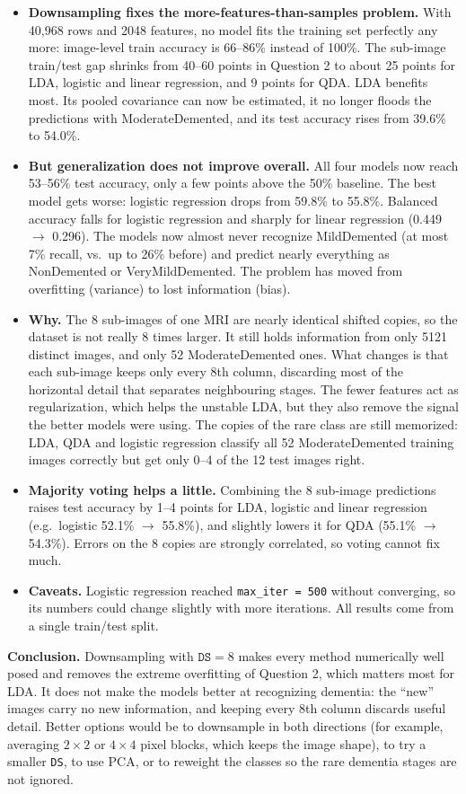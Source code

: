 \documentclass[11pt]{article}
\begin{document}
\begin{itemize}
  \item \textbf{Downsampling fixes the more-features-than-samples problem.} With 40{,}968 rows
  and 2048 features, no model fits the training set perfectly any more: image-level train
  accuracy is 66--86\% instead of 100\%. The sub-image train/test gap shrinks from 40--60
  points in Question 2 to about 25 points for LDA, logistic and linear regression, and 9
  points for QDA. LDA benefits most. Its pooled covariance can now be estimated, it no longer
  floods the predictions with ModerateDemented, and its test accuracy rises from 39.6\% to
  54.0\%.
  \item \textbf{But generalization does not improve overall.} All four models now reach
  53--56\% test accuracy, only a few points above the 50\% baseline. The best model gets
  worse: logistic regression drops from 59.8\% to 55.8\%. Balanced accuracy falls for
  logistic regression and sharply for linear regression (0.449 $\to$ 0.296). The models now
  almost never recognize MildDemented (at most 7\% recall, vs.\ up to 26\% before) and
  predict nearly everything as NonDemented or VeryMildDemented. The problem has moved from
  overfitting (variance) to lost information (bias).
  \item \textbf{Why.} The 8 sub-images of one MRI are nearly identical shifted copies, so the
  dataset is not really 8 times larger. It still holds information from only 5121 distinct
  images, and only 52 ModerateDemented ones. What changes is that each sub-image keeps only
  every 8th column, discarding most of the horizontal detail that separates neighbouring
  stages. The fewer features act as regularization, which helps the unstable LDA, but they
  also remove the signal the better models were using. The copies of the rare class are still
  memorized: LDA, QDA and logistic regression classify all 52 ModerateDemented training images
  correctly but get only 0--4 of the 12 test images right.
  \item \textbf{Majority voting helps a little.} Combining the 8 sub-image predictions raises
  test accuracy by 1--4 points for LDA, logistic and linear regression (e.g.\ logistic
  52.1\% $\to$ 55.8\%), and slightly lowers it for QDA (55.1\% $\to$ 54.3\%). Errors on the
  8 copies are strongly correlated, so voting cannot fix much.
  \item \textbf{Caveats.} Logistic regression reached \texttt{max\_iter = 500} without
  converging, so its numbers could change slightly with more iterations. All results come
  from a single train/test split.
\end{itemize}

\textbf{Conclusion.} Downsampling with $\texttt{DS} = 8$ makes every method numerically well
posed and removes the extreme overfitting of Question 2, which matters most for LDA. It
does not make the models better at recognizing dementia: the ``new'' images carry no new
information, and keeping every 8th column discards useful detail. Better options would be
to downsample in both directions (for example, averaging $2 \times 2$ or $4 \times 4$ pixel
blocks, which keeps the image shape), to try a smaller \texttt{DS}, to use PCA, or to
reweight the classes so the rare dementia stages are not ignored.
\end{document}
